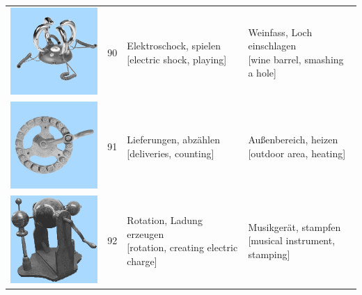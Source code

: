 \documentclass[
  english,
  man,floatsintext]{apa7}
\begin{document}
\begin{center}
\begin{ThreePartTable}
{\begin{longtable}{llll}
\includegraphics[valign=c, scale=0.23]{../materials/unfamiliar/90.png} & 90 & \makecell[l]{Elektroschock, spielen\\{[electric shock, playing]}} & \makecell[l]{Weinfass, Loch einschlagen\\{[wine barrel, smashing a hole]}}\\
\includegraphics[valign=c, scale=0.23]{../materials/unfamiliar/91.png} & 91 & \makecell[l]{Lieferungen, abzählen\\{[deliveries, counting]}} & \makecell[l]{Außenbereich, heizen\\{[outdoor area, heating]}}\\
\includegraphics[valign=c, scale=0.23]{../materials/unfamiliar/92.png} & 92 & \makecell[l]{Rotation, Ladung erzeugen\\{[rotation, creating electric charge]}} & \makecell[l]{Musikgerät, stampfen\\{[musical instrument, stamping]}}\\

\end{longtable}}
\end{ThreePartTable}
\end{center}
\end{document}
